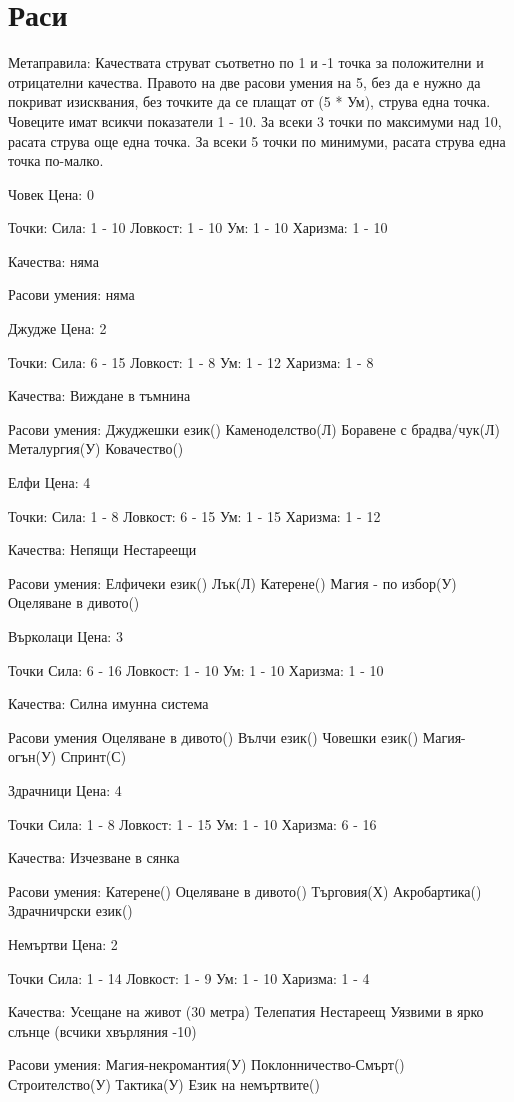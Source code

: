 \section{Раси}
Метаправила:
Качествата струват съответно по 1 и -1 точка за положителни и отрицателни качества.
Правото на две расови умения на 5, без да е нужно да покриват изисквания, без точките да се плащат от (5 * Ум), струва една точка.
Човеците имат всикчи показатели 1 - 10.
За всеки 3 точки по максимуми над 10, расата струва още една точка.
За всеки 5 точки по минимуми, расата струва една точка по-малко.

Човек
Цена: 0

Точки:
Сила: 1 - 10
Ловкост: 1 - 10
Ум: 1 - 10
Харизма: 1 - 10

Качества:
няма

Расови умения:
няма


Джудже
Цена: 2

Точки:
Сила: 6 - 15 
Ловкост: 1 - 8
Ум: 1 - 12
Харизма: 1 - 8

Качества:
Виждане в тъмнина

Расови умения:
Джуджешки език()
Каменоделство(Л)
Боравене с брадва/чук(Л)
Металургия(У)
Ковачество()


Елфи
Цена: 4

Точки:
Сила: 1 - 8
Ловкост: 6 - 15
Ум: 1 - 15
Харизма: 1 - 12

Качества:
Непящи
Нестареещи

Расови умения:
Елфичеки език()
Лък(Л)
Катерене()
Магия - по избор(У)
Оцеляване в дивото()


Върколаци
Цена: 3

Точки
Сила: 6 - 16
Ловкост: 1 - 10
Ум: 1 - 10
Харизма: 1 - 10

Качества:
Силна имунна система

Расови умения
Оцеляване в дивото()
Вълчи език()
Човешки език()
Магия-огън(У)
Спринт(С)


Здрачници
Цена: 4

Точки
Сила: 1 - 8
Ловкост: 1 - 15
Ум: 1 - 10
Харизма: 6 - 16

Качества:
Изчезване в сянка

Расови умения:
Катерене()
Оцеляване в дивото()
Търговия(Х)
Акробартика()
Здрачничрски език()


Немъртви
Цена: 2

Точки
Сила: 1 - 14
Ловкост: 1 - 9
Ум: 1 - 10
Харизма: 1 - 4

Качества:
Усещане на живот (30 метра)
Телепатия
Нестареещ
Уязвими в ярко слънце (всчики хвърляния -10)

Расови умения:
Магия-некромантия(У)
Поклонничество-Смърт()
Строителство(У)
Тактика(У)
Език на немъртвите()

